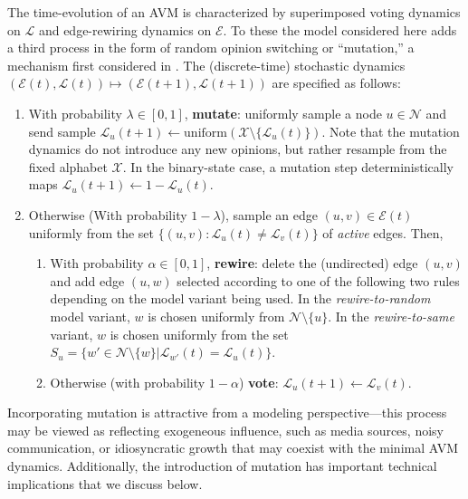 \documentclass[review, onefignum, onetabnum]{siamart171218}
\begin{document}
	The time-evolution of an AVM is characterized by superimposed voting dynamics on $\mathcal{L}$ and edge-rewiring dynamics on $\mathcal{E}$. 
	To these the model considered here adds a third process in the form of random opinion switching or ``mutation,'' a mechanism first considered in \cite{Ji2013}. 
	The (discrete-time) stochastic dynamics $(\mathcal{E}(t), \mathcal{L}(t)) \mapsto (\mathcal{E}(t+1), \mathcal{L}(t+1))$ are specified as follows:
		\begin{enumerate}
			\item With probability $\lambda \in [0,1]$, \textbf{mutate}: uniformly sample a node $u\in \mathcal{N}$ and send sample $\mathcal{L}_u(t+1)  \gets \mathrm{uniform}(\mathcal{X}\setminus \{\mathcal{L}_u(t)\})$.
			Note that the mutation dynamics do not introduce any new opinions, but rather resample from the fixed alphabet $\mathcal{X}$. 
			In the binary-state case, a mutation step deterministically maps $\mathcal{L}_u(t+1)\gets 1 - \mathcal{L}_u(t)$. 
			\item Otherwise (With probability $1-\lambda$),  sample an edge $(u,v) \in \mathcal{E}(t)$ uniformly from the set $\{(u,v):\mathcal{L}_u(t) \neq \mathcal{L}_v(t)\}$ of \emph{active} edges. Then, 
			\begin{enumerate}
				\item With probability $\alpha \in [0,1]$, \textbf{rewire}: delete the (undirected) edge $(u,v)$ and add edge $(u,w)$ selected according to one of the following two rules depending on the model variant being used. 
				In the \emph{rewire-to-random} model variant, $w$ is chosen uniformly from $\mathcal{N}\setminus \{u\}$. 
				In the \emph{rewire-to-same} variant, $w$ is chosen uniformly from the set $S_u = \{w' \in \mathcal{N}\setminus \{w\} | \mathcal{L}_{w'}(t) = \mathcal{L}_u(t)\}$. 
				\item Otherwise (with probability $1-\alpha$) \textbf{vote}:  $\mathcal{L}_u(t+1) \gets \mathcal{L}_v(t)$. 
			\end{enumerate}
		\end{enumerate}
	Incorporating mutation is attractive from a modeling perspective---this process may be viewed as reflecting exogeneous influence, such as media sources, noisy communication, or idiosyncratic growth that may coexist with the minimal AVM dynamics.  
	Additionally, the introduction of mutation has important technical implications that we discuss below. 
	
\end{document}
